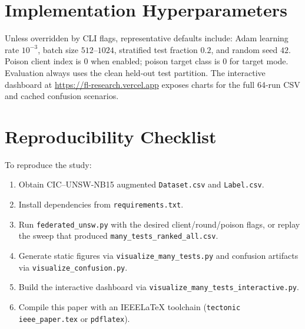 \documentclass[journal]{IEEEtran}
\begin{document}
\section{Implementation Hyperparameters}
\label{app:hyper}
Unless overridden by CLI flags, representative defaults include: Adam learning rate $10^{-3}$, batch size $512$--$1024$, stratified test fraction $0.2$, and random seed $42$. Poison client index is $0$ when enabled; poison target class is $0$ for target mode. Evaluation always uses the clean held-out test partition. The interactive dashboard at \url{https://fl-research.vercel.app} exposes charts for the full 64-run CSV and cached confusion scenarios.

\section{Reproducibility Checklist}
\label{app:repro}
To reproduce the study:
\begin{enumerate}
\item Obtain CIC--UNSW-NB15 augmented \texttt{Dataset.csv} and \texttt{Label.csv}.
\item Install dependencies from \texttt{requirements.txt}.
\item Run \texttt{federated\_unsw.py} with the desired client/round/poison flags, or replay the sweep that produced \texttt{many\_tests\_ranked\_all.csv}.
\item Generate static figures via \texttt{visualize\_many\_tests.py} and confusion artifacts via \texttt{visualize\_confusion.py}.
\item Build the interactive dashboard via \texttt{visualize\_many\_tests\_interactive.py}.
\item Compile this paper with an IEEE\LaTeX{} toolchain (\texttt{tectonic ieee\_paper.tex} or \texttt{pdflatex}).
\end{enumerate}
\end{document}
